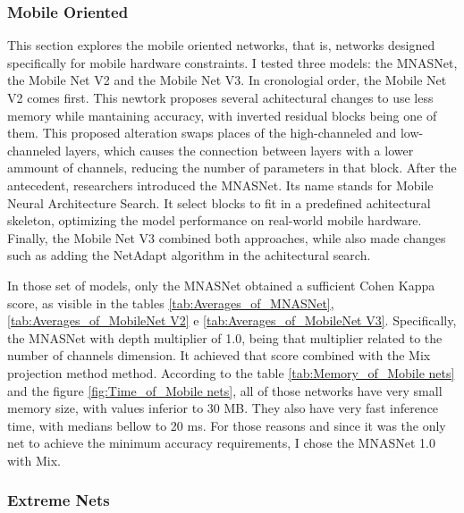\FloatBarrier

\subsubsection{Mobile Oriented}

This section explores the mobile oriented networks, that is, networks designed specifically for mobile hardware constraints. I tested three models: the MNASNet, the Mobile Net V2 and the Mobile Net V3. In cronologial order, the Mobile Net V2 comes first. This newtork proposes several achitectural changes to use less memory while mantaining accuracy, with inverted residual blocks being one of them. This proposed alteration swaps places of the high-channeled and low-channeled layers, which causes the connection between layers with a lower ammount of channels, reducing the number of parameters in that block. After the antecedent, researchers introduced the MNASNet. Its name stands for Mobile Neural Architecture Search. It select blocks to fit in a predefined achitectural skeleton, optimizing the model performance on real-world mobile hardware. Finally, the Mobile Net V3 combined both approaches, while also made changes such as adding the NetAdapt \cite{NetAdapt} algorithm in the achitectural search.

In those set of models, only the MNASNet obtained a sufficient Cohen Kappa score, as visible in the tables \ref{tab:Averages_of_MNASNet}, \ref{tab:Averages_of_MobileNet V2} e \ref{tab:Averages_of_MobileNet V3}. Specifically, the MNASNet with depth multiplier of 1.0, being that multiplier related to the number of channels dimension. It achieved that score combined with the \acrshort{Mix} projection method method. According to the table \ref{tab:Memory_of_Mobile nets} and the figure \ref{fig:Time_of_Mobile nets}, all of those networks have very small memory size, with values inferior to 30 MB. They also have very fast inference time, with medians bellow to 20 ms. For those reasons and since it was the only net to achieve the minimum accuracy requirements, I chose the MNASNet 1.0 with \acrshort{Mix}. 






\FloatBarrier

\subsubsection{Extreme Nets}


